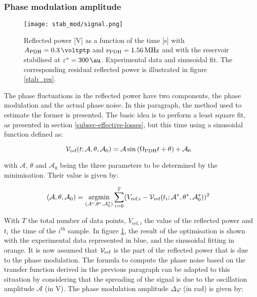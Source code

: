 
\subsubsection{Phase modulation amplitude}

\begin{figure}
	\centering
	\texttt{[image: stab\_mod/signal.png]}
	\caption{Reflected power [\si{\volt}] as a function of the time [\si{\second}] with $\tind{A}{PDH} = \SI{0.3}{\voltptp}$ and $\nu_{\text{PDH}} = \SI{1.56}{\mega\hertz}$ and with the reservoir stabilised at $\epsilon^* = \SI{300}{\au}$. Experimental data and sinusoidal fit. The corresponding residual reflected power is illustrated in figure \ref{stab_res}.}
	\label{stab_mod_signal}
\end{figure}

The phase fluctuations in the reflected power have two components, the \pdh phase modulation and the actual phase noise. In this paragraph, the method used to estimate the former is presented. The basic idea is to perform a least square fit, as presented in section \ref{subsec-effective-losses}, but this time using a sinusoidal function defined as:

\begin{equation}
	\mathcal{V}_{\text{ref}}(t;\mathcal{A},\theta,\mathcal{A}_0) = \mathcal{A}\sin{(\Omega_{\text{PDH}}t+\theta)}+\mathcal{A}_0
\end{equation}

with $\mathcal{A}$, $\theta$ and $\mathcal{A}_0$ being the three parameters to be determined by the minimisation. Their value is given by:

\begin{equation}
	(\mathcal{A},\theta,\mathcal{A}_0) = \underset{(\mathcal{A}^*,\theta^*,\mathcal{A}_0^*)}{\text{argmin}} \sum_{i=0}^T (V_{\text{ref},i} - \mathcal{V}_{\text{ref}}(t_i;\mathcal{A}^*,\theta^*,\mathcal{A}_0^*))^2
\end{equation}

With $T$ the total number of data points, $V_{\text{ref},i}$ the value of the reflected power and $t_i$ the time of the $i^{\text{th}}$ sample. In figure \ref{stab_mod_signal}, the result of the optimisation is shown with the experimental data represented in blue, and the sinusoidal fitting in orange. It is now assumed that $\mathcal{V}_{\text{ref}}$ is the part of the reflected power that is due to the phase modulation. The formula to compute the phase noise based on the transfer function derived in the previous paragraph can be adapted to this situation by considering that the spreading of the signal is due to the oscillation amplitude $\mathcal{A}$ (in \si{\volt}). The phase modulation amplitude $\Delta \varphi$ (in \si{\radian}) is given by:

